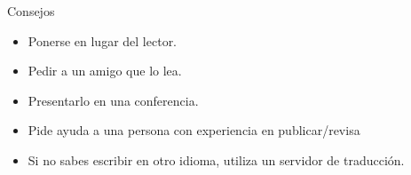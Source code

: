 \begin{frame}{Consejos}
\begin{block}{}
\begin{itemize}
    \item Ponerse en lugar del lector.
    \item Pedir a un amigo que lo lea.
    \item Presentarlo en una conferencia.
    \item Pide ayuda a una persona con experiencia en publicar/revisa
    \item Si no sabes escribir en otro idioma, utiliza un servidor de traducción.
\end{itemize}
\end{block}   
\end{frame}

